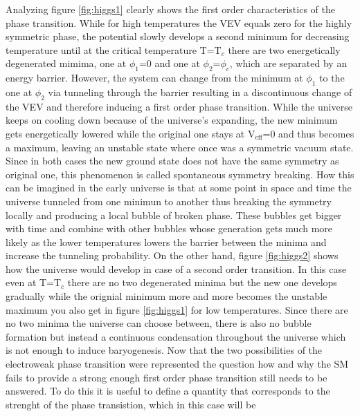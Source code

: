 \noindent
Analyzing figure \ref{fig:higgs1} clearly shows the first order characteristics of the phase transition. While for high temperatures the VEV equals zero for the highly symmetric phase, the potential slowly develops a second minimum for decreasing temperature until at the critical temperature T=T$_c$ there are two energetically degenerated mimima, one at $\phi_1$=0 and one at $\phi_2$=$\phi_c$, which are separated by an energy barrier. However, the system can change from the minimum at $\phi_1$ to the one at $\phi_2$ via tunneling through the barrier resulting in a discontinuous change of the VEV and therefore inducing a first order phase transition. While the universe keeps on cooling down because of the universe's expanding, the new minimum gets energetically lowered while the original one stays at V$_\text{eff}$=0 and thus becomes a maximum, leaving an unstable state where once was a symmetric vacuum state. Since in both cases the new ground state does not have the same symmetry as original one, this phenomenon is called spontaneous symmetry breaking.\newline\indent
How this can be imagined in the early universe is that at some point in space and time the universe tunneled from one minimun to another thus breaking the symmetry locally and producing a local bubble of broken phase. These bubbles get bigger with time and combine with other bubbles whose generation gets much more likely as the lower temperatures lowers the barrier between the minima and increase the tunneling probability. \newline\indent
On the other hand, figure \ref{fig:higgs2} shows how the universe would develop in case of a second order transition. In this case even at T=T$_c$ there are no two degenerated minima but the new one develops gradually while the orignial minimum more and more becomes the unstable maximum you also get in figure \ref{fig:higgs1} for low temperatures. Since there are no two minima the universe can choose between, there is also no bubble formation but instead a continuous condensation throughout the universe which is not enough to induce baryogenesis. \newline\indent
Now that the two possibilities of the electroweak phase transition were represented the question how and why the SM fails to provide a strong enough first order phase transition still needs to be answered. \newline\indent
To do this it is useful to define a quantity that corresponds to the strenght of the phase transistion, which in this case will be 
